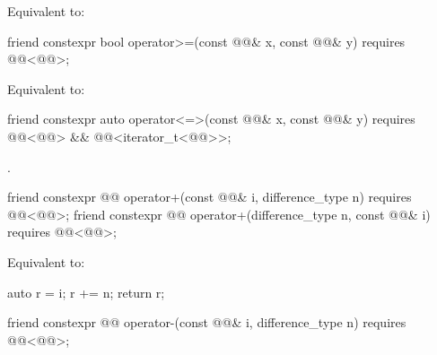 \begin{itemdescr}
\pnum
\effects
Equivalent to: 
\end{itemdescr}

%
\begin{itemdecl}
friend constexpr bool operator>=(const @@& x, const @@& y)
  requires @@<@@>;
\end{itemdecl}

\begin{itemdescr}
\pnum
\effects
Equivalent to: 
\end{itemdescr}

%
\begin{itemdecl}
friend constexpr auto operator<=>(const @@& x, const @@& y)
  requires @@<@@> &&
           @@<iterator_t<@@>>;
\end{itemdecl}

\begin{itemdescr}
\pnum
\returns
{}.
\end{itemdescr}

%
\begin{itemdecl}
friend constexpr @@ operator+(const @@& i, difference_type n)
  requires @@<@@>;
friend constexpr @@ operator+(difference_type n, const @@& i)
  requires @@<@@>;
\end{itemdecl}

\begin{itemdescr}
\pnum
\effects
Equivalent to:
\begin{codeblock}
auto r = i;
r += n;
return r;
\end{codeblock}
\end{itemdescr}

%
\begin{itemdecl}
friend constexpr @@ operator-(const @@& i, difference_type n)
  requires @@<@@>;
\end{itemdecl}

